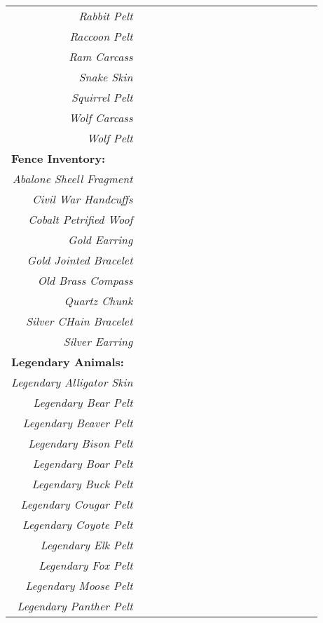 \documentclass{article}
\begin{document}
\begin{footnotesize}
\begin{tabular}{|r|c|c|c|c|c|c|c|c|c|c|c|c|c|c|c|c|}
	\cline{0-2}
	\textit{Rabbit Pelt} & \\
	\cline{0-1}
	\textit{Raccoon Pelt} & \\
	\cline{0-1}
	\textit{Ram Carcass} & \\
	\cline{0-1}
	\textit{Snake Skin} & \\
	\cline{0-1}
	\textit{Squirrel Pelt} & \\
	\cline{0-1}
	\textit{Wolf Carcass} & \\
	\cline{0-2}
	\textit{Wolf Pelt} & & \\
	\cline{0-2}
	\cline{0-0}
	\multicolumn{0}{|l|}{\textbf{Fence Inventory:}}\\
	\cline{0-0}
	\cline{0-1}
	\textit{Abalone Sheell Fragment} & \\
	\cline{0-1}
	\textit{Civil War Handcuffs} & \\
	\cline{0-1}
	\textit{Cobalt Petrified Woof} & \\
	\cline{0-1}
	\textit{Gold Earring} & \\
	\cline{0-1}
	\textit{Gold Jointed Bracelet} & \\
	\cline{0-1}
	\textit{Old Brass Compass} & \\
	\cline{0-1}
	\textit{Quartz Chunk} & \\
	\cline{0-1}
	\textit{Silver CHain Bracelet} & \\
	\cline{0-1}
	\textit{Silver Earring} & \\
	\cline{0-1}
	\cline{0-0}
	\multicolumn{0}{|l|}{\textbf{Legendary Animals:}}\\
	\cline{0-0}
	\cline{0-1}
	\textit{Legendary Alligator Skin} & \\
	\cline{0-1}
	\textit{Legendary Bear Pelt} & \\
	\cline{0-1}
	\textit{Legendary Beaver Pelt} & \\
	\cline{0-1}
	\textit{Legendary Bison Pelt} & \\
	\cline{0-1}
	\textit{Legendary Boar Pelt} & \\
	\cline{0-1}
	\textit{Legendary Buck Pelt} & \\
	\cline{0-1}
	\textit{Legendary Cougar Pelt} & \\
	\cline{0-1}
	\textit{Legendary Coyote Pelt} & \\
	\cline{0-1}
	\textit{Legendary Elk Pelt} & \\
	\cline{0-1}
	\textit{Legendary Fox Pelt} & \\
	\cline{0-1}
	\textit{Legendary Moose Pelt} & \\
	\cline{0-1}
	\textit{Legendary Panther Pelt} & \\

\end{tabular}
\end{footnotesize}
\end{document}
